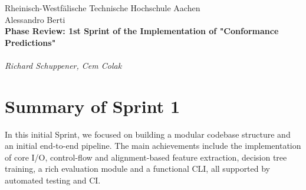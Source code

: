 \documentclass[12pt,a4paper]{article}
\begin{document}
\thispagestyle{empty}
\begin{center}
Rheinisch-Westf\"alische Technische Hochschule Aachen \\
Alessandro Berti\\[6ex]

\LARGE
	\textbf{Phase Review: 1st Sprint of the Implementation of "Conformance Predictions"} \\[6ex]
        \\
	\textit{Richard Schuppener, Cem Colak} \\[6ex]
\end{center}

\newpage

\tableofcontents
\newpage

\section{Summary of Sprint 1}
In this initial Sprint, we focused on building a modular codebase structure and an initial end-to-end pipeline. The main achievements include the implementation of core I/O, control-flow and alignment-based feature extraction, decision tree training, a rich evaluation module and a functional CLI, all supported by automated testing and CI.
\end{document}
